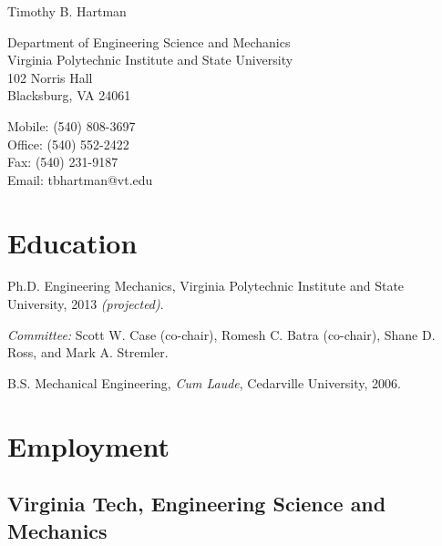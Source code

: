 \documentclass[10pt,letterpaper]{article}
\def\name{Timothy B. Hartman}
\renewenvironment{itemize}{
  \begin{list}{}{
    \setlength{\leftmargin}{1.5em}
    \setlength{\itemsep}{0.25em}
    \setlength{\parskip}{0pt}
    \setlength{\parsep}{0.25em}
  }
}{
  \end{list}
}
\begin{document}
{\huge \name}


\bigskip

\begin{minipage}[t]{0.5\textwidth}
  Department of Engineering Science and Mechanics \\
  Virginia Polytechnic Institute and State University \\
  102 Norris Hall \\
  Blacksburg, VA 24061
\end{minipage}
\begin{minipage}[t]{0.5\textwidth}
  Mobile: (540) 808-3697 \\
  Office: (540) 552-2422 \\
  Fax: (540) 231-9187 \\
  Email: tbhartman@vt.edu \\
\end{minipage}

%
%

\section*{Education}

\begin{itemize}
  \item Ph.D. Engineering Mechanics, Virginia Polytechnic Institute and State University, 2013 \textit{(projected)}.
    \begin{itemize}
    \item \textit{Committee:}
      Scott W. Case (co-chair), Romesh C. Batra (co-chair),
      Shane D. Ross, and Mark A. Stremler.
    \end{itemize}
  \item B.S. Mechanical Engineering, \textit{Cum Laude},
    Cedarville University, 2006.
\end{itemize}

%
%

\section*{Employment}

\subsection*{Virginia Tech, Engineering Science and Mechanics}
\end{document}
